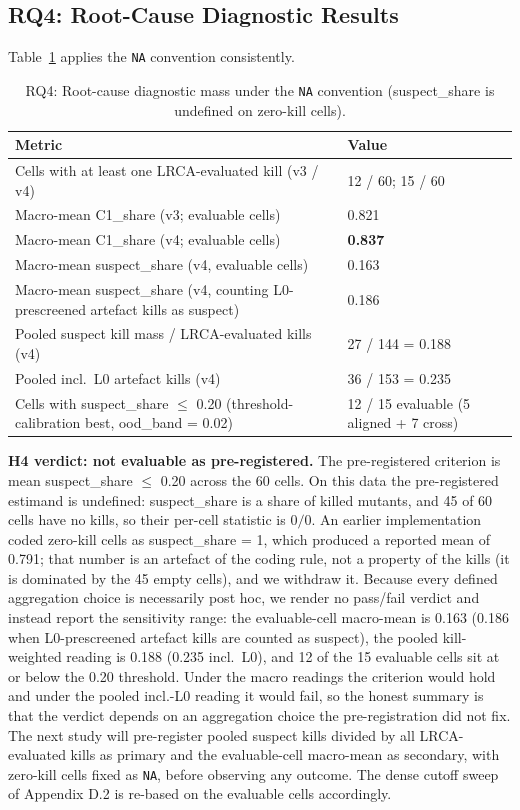 \documentclass[manuscript,screen,review]{acmart}
\begin{document}
\subsection{RQ4: Root-Cause Diagnostic Results}\label{h5-lrca-mass}

Table~\ref{tab:p2-13} applies the \texttt{NA} convention consistently.
\begin{table}[t]
\caption{RQ4: Root-cause diagnostic mass under the \texttt{NA}
convention (suspect\_share is undefined on zero-kill cells).}
\label{tab:p2-13}
\centering
\small
\begin{tabular}{ll}
\toprule
Metric & Value \\
\midrule
Cells with at least one LRCA-evaluated kill (v3 / v4) & 12 / 60; 15 / 60 \\
Macro-mean C1\_share (v3; evaluable cells) & 0.821 \\
Macro-mean C1\_share (v4; evaluable cells) & \textbf{0.837} \\
Macro-mean suspect\_share (v4, evaluable cells) & 0.163 \\
Macro-mean suspect\_share (v4, counting L0-prescreened artefact kills as suspect) & 0.186 \\
Pooled suspect kill mass / LRCA-evaluated kills (v4) & 27 / 144 = 0.188 \\
Pooled incl.\ L0 artefact kills (v4) & 36 / 153 = 0.235 \\
Cells with suspect\_share $\leq$ 0.20 (threshold-calibration best, ood\_band = 0.02) & 12 / 15 evaluable (5 aligned + 7 cross) \\
\bottomrule
\end{tabular}
\end{table}

\textbf{H4 verdict: not evaluable as pre-registered.} The
pre-registered criterion is mean suspect\_share $\leq$ 0.20 across the
60 cells. On this data the pre-registered estimand is undefined:
suspect\_share is a share of killed mutants, and 45 of 60 cells have no
kills, so their per-cell statistic is $0/0$. An earlier implementation
coded zero-kill cells as suspect\_share = 1, which produced a reported
mean of 0.791; that number is an artefact of the coding rule, not a
property of the kills (it is dominated by the 45 empty cells), and we
withdraw it. Because every defined aggregation choice is necessarily
post hoc, we render no pass/fail verdict and instead report the
sensitivity range: the evaluable-cell macro-mean is 0.163 (0.186 when
L0-prescreened artefact kills are counted as suspect), the pooled
kill-weighted reading is 0.188 (0.235 incl.\ L0), and 12 of the 15
evaluable cells sit at or below the 0.20 threshold. Under the macro
readings the criterion would hold and under the pooled incl.-L0 reading
it would fail, so the honest summary is that the verdict depends on an
aggregation choice the pre-registration did not fix. The next study
will pre-register pooled suspect kills divided by all LRCA-evaluated
kills as primary and the evaluable-cell macro-mean as secondary, with
zero-kill cells fixed as \texttt{NA}, before observing any outcome. The dense cutoff
sweep of Appendix D.2 is re-based on the evaluable cells accordingly.
\end{document}
